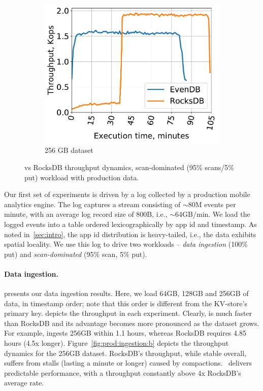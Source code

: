 \begin{figure}[tb]
\begin{subfigure}{0.3\linewidth}
\includegraphics[width=\textwidth]{figs/throughput_256_scans_10s_line.pdf}
\caption{256 GB dataset}
\label{fig:prod:analytics:c}
\end{subfigure}
\caption{\sys\/ vs RocksDB throughput dynamics,  scan-dominated (95\% scans/5\% put) workload with production data.}
\label{fig:prod:analytics}
\end{figure}

Our first set of experiments is driven by a log collected by a production mobile analytics engine. The log captures 
a stream consisting of $\sim$80M events per minute, with an average log record size of 800B, i.e., $\sim$64GB/min. 
We load the logged events into a table ordered  lexicographically by app id and timestamp. 
As noted in~\cref{sec:intro}, the app id distribution is heavy-tailed, i.e., the data exhibits spatial locality. 
We use this log to drive two workloads -- \emph{data ingestion} (100\% put) and \emph{scan-dominated} (95\% scan, 5\% put).

\paragraph{Data ingestion.} 
 presents our  data ingestion results. 
Here, we load 64GB, 128GB and 256GB of data, in timestamp order; note that this order is different from the KV-store's primary key. 
  depicts the throughput in each experiment. Clearly, \sys\/ is much faster than RocksDB and its advantage 
becomes more pronounced as the dataset grows. For example, \sys\/ ingests 256GB  within 1.1 hours, 
whereas RocksDB requires 4.85 hours (4.5x longer). Figure~\ref{fig:prod:ingestion:b} depicts the  
throughput dynamics for the 256GB dataset. RocksDB's throughput, while stable overall, suffers from stalls 
(lasting a minute or longer) caused by compactions. 
\sys\ delivers predictable performance, with a throughput constantly above 4x RocksDB's average rate.

